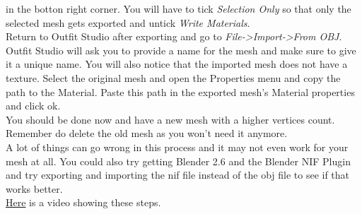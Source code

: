 in the botton right corner. You will have to tick \textit{Selection Only} so that only the selected mesh gets exported and untick \textit{Write Materials}.\\
Return to Outfit Studio after exporting and go to \textit{File->Import->From OBJ}. Outfit Studio will ask you to provide a name for the 
mesh and make sure to give it a unique name. You will also notice that the imported mesh does not have a texture. Select the original 
mesh and open the Properties menu and copy the path to the Material. Paste this path in the exported mesh's Material properties and click ok.\\
You should be done now and have a new mesh with a higher vertices count. Remember do delete the old mesh as you won't need it anymore.\\
A lot of things can go wrong in this process and it may not even work for your mesh at all. You could also try getting Blender 2.6 and the 
Blender NIF Plugin and try exporting and importing the nif file instead of the obj file to see if that works better.\\
\href{https://drive.google.com/uc?export=download&id=1LNknq-uvtHyA-E1qz5QXfkxsCuPgLoSv}{Here} is a video showing these steps.